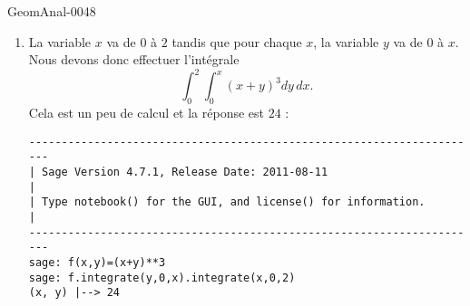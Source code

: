 \begin{corrige}{GeomAnal-0048}

    \begin{enumerate}
        \item
            La variable \( x\) va de \( 0\) à \( 2\) tandis que pour chaque \( x\), la variable \( y\) va de \( 0\) à \( x\). Nous devons donc effectuer l'intégrale
            \begin{equation}
                \int_0^2\int_0^x(x+y)^3dy\,dx.
            \end{equation}
            Cela est un peu de calcul et la réponse est \( 24\) :
            \begin{verbatim}
----------------------------------------------------------------------
| Sage Version 4.7.1, Release Date: 2011-08-11                       |
| Type notebook() for the GUI, and license() for information.        |
----------------------------------------------------------------------
sage: f(x,y)=(x+y)**3
sage: f.integrate(y,0,x).integrate(x,0,2)
(x, y) |--> 24
            \end{verbatim}


\end{enumerate}
\end{corrige}
